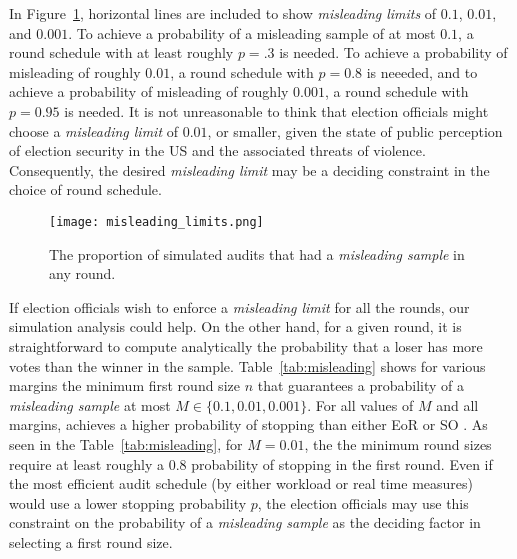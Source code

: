 In Figure~\ref{fig:misleading}, horizontal lines are included to show \emph{misleading limits} of $0.1$, $0.01$, and $0.001$.
To achieve a probability of a misleading sample of at most $0.1$, a round schedule with at least roughly $p=.3$ is needed.
To achieve a probability of misleading of roughly $0.01$, a round schedule with $p=0.8$ is neeeded, and to achieve a probability of misleading of roughly $0.001$, a round schedule with $p=0.95$ is needed.
It is not unreasonable to think that election officials might choose a \emph{misleading limit} of $0.01$, or smaller, given the state of public perception of election security in the US and the associated threats of violence.
Consequently, the desired \emph{misleading limit} may be a deciding constraint in the choice of round schedule. 

\begin{figure}
\texttt{[image: misleading\_limits.png]}
\caption{The proportion of simulated \Providence audits that had a \emph{misleading sample} in any round.}
\label{fig:misleading}
\end{figure}

If election officials wish to enforce a \emph{misleading limit} for all the rounds, our simulation analysis could help. On the other hand, for a given round, it is straightforward to compute analytically the probability that a loser has more votes than the winner in the sample. Table~\ref{tab:misleading} shows for various margins the minimum first round size $n$ that guarantees a probability of a \emph{misleading sample} at most $M\in\{0.1,0.01,0.001\}$. For all values of $M$ and all margins, \Providence achieves a higher probability of stopping than either EoR \BRAVO or SO \BRAVO. 
    As seen in the Table~\ref{tab:misleading}, for $M=0.01$, the the minimum round sizes require at least roughly a $0.8$ probability of stopping in the first round. Even if the most efficient audit schedule (by either workload or real time measures) would use a lower stopping probability $p$, the election officials may use this constraint on the probability of a \emph{misleading sample} as the deciding factor in selecting a first round size.

